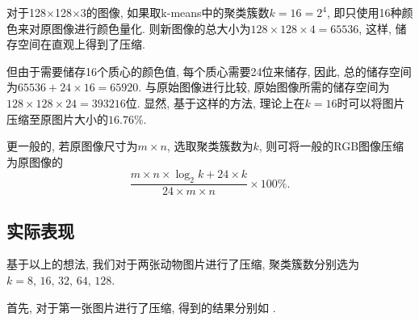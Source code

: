 \documentclass[lang=cn,11pt]{elegantpaper}
\begin{document}
对于128$\times$128$\times$3的图像, 如果取k-means中的聚类簇数$k=16=2^4$, 即只使用16种颜色来对原图像进行颜色量化. 则新图像的总大小为$128\times128\times4 = 65536$, 这样, 储存空间在直观上得到了压缩. 

但由于需要储存16个质心的颜色值, 每个质心需要24位来储存, 因此, 总的储存空间为$65536 + 24 \times 16 = 65920$. 与原始图像进行比较, 原始图像所需的储存空间为$128 \times 128 \times 24 = 393216$位. 显然, 基于这样的方法, 理论上在$k=16$时可以将图片压缩至原图片大小的$16.76\%$. 

更一般的, 若原图像尺寸为$m\times n$, 选取聚类簇数为$k$, 则可将一般的RGB图像压缩为原图像的$$\frac{m\times n \times \log_2k+24\times k}{24\times m\times n}\times 100\%.$$
\subsection{实际表现}
基于以上的想法, 我们对于两张动物图片进行了压缩, 聚类簇数分别选为$k=8,\,16,\,32,\,64,\,128$.

\noindent 首先, 对于第一张图片进行了压缩, 得到的结果分别如 .
\end{document}
